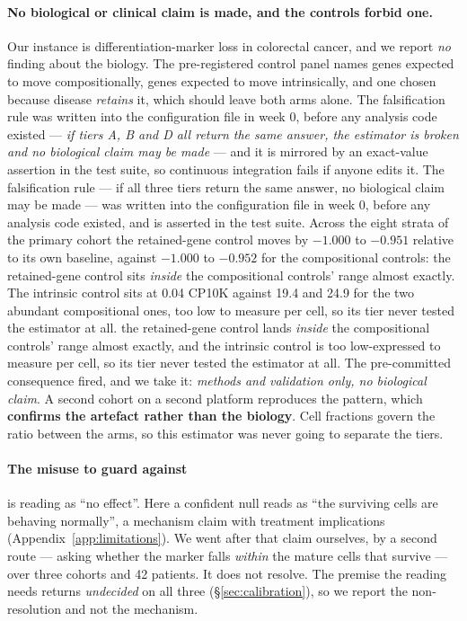 
\paragraph{No biological or clinical claim is made, and the controls forbid
one.} Our instance is differentiation-marker loss in colorectal cancer, and we
report \emph{no} finding about the biology. The pre-registered control panel
names genes expected to move compositionally, genes expected to move
intrinsically, and one chosen because disease \emph{retains} it, which should
leave both arms alone. \iffull
The falsification rule was written into the configuration
file in week 0, before any analysis code existed --- \emph{if tiers A, B and D
all return the same answer, the estimator is broken and no biological claim may
be made} --- and it is mirrored by an exact-value assertion in the test suite, so
continuous integration fails if anyone edits it.
\else
The falsification rule --- if all three tiers return the same answer, no
biological claim may be made --- was written into the configuration file in week
0, before any analysis code existed, and is asserted in the test suite.
\fi Across the eight strata of the
primary cohort
\iffull
the retained-gene control moves by $-1.000$ to $-0.951$ relative
to its own baseline, against $-1.000$ to $-0.952$ for the compositional
controls: the retained-gene control sits \emph{inside} the compositional
controls' range almost exactly. The intrinsic control sits at 0.04 CP10K against
19.4 and 24.9 for the two abundant compositional ones, too low to measure per
cell, so its tier never tested the estimator at all.
\else
the retained-gene control lands \emph{inside} the compositional
controls' range almost exactly, and the intrinsic control is too low-expressed to
measure per cell, so its tier never tested the estimator at all.
\fi
The pre-committed
consequence fired, and we take it: \emph{methods and validation only, no
biological claim}. A second cohort on a second platform reproduces the pattern,
which \textbf{confirms the artefact rather than the biology}. Cell fractions
govern the ratio between the arms, so this estimator was never going to separate
the tiers.

\paragraph{The misuse to guard against} is reading \notest{} as ``no effect''.
Here a confident null reads as ``the surviving cells are behaving normally'', a
mechanism claim with treatment implications\iffull{}
(Appendix~\ref{app:limitations}). We went after that claim ourselves, by a
second route --- asking whether the marker falls \emph{within} the mature cells
that survive --- over three cohorts and 42 patients. It does not resolve. The
premise the reading needs returns \emph{undecided} on all three
(\S\ref{sec:calibration}), so we report the non-resolution and not the
mechanism\fi.

